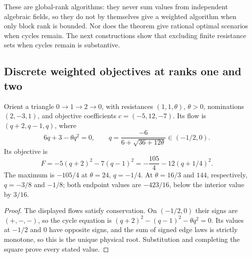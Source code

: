 These are global-rank algorithms: they never sum values from independent
algebraic fields, so they do not by themselves give a weighted algorithm
when only block rank is bounded. Nor does the theorem give rational
optimal scenarios when cycles remain. The next constructions show that
excluding finite resistance sets when cycles remain is substantive.

\subsection{Discrete weighted objectives at ranks one and two}

\begin{lemma}
\label{lem:a-weight-triangle}
Orient a triangle $0\to1\to2\to0$, with resistances $(1,1,\theta)$,
$\theta>0$, nominations $(2,-3,1)$, and objective coefficients
$c=(-5,12,-7)$. Its flow is $(q+2,q-1,q)$, where
\[
 6q+3-\theta q^2=0,\qquad
 q=\frac{-6}{6+\sqrt{36+12\theta}}\in(-1/2,0).
\]
Its objective is
\begin{equation}
 F=-5(q+2)^2-7(q-1)^2
   =-\frac{105}{4}-12(q+1/4)^2.
 \label{eq:a-weight-triangle}
\end{equation}
The maximum is $-105/4$ at $\theta=24$, $q=-1/4$.
At $\theta=16/3$ and $144$, respectively, $q=-3/8$ and $-1/8$;
both endpoint values are $-423/16$, below the interior value by $3/16$.
\end{lemma}
\begin{proof}
The displayed flows satisfy conservation. On $(-1/2,0)$ their signs are
$(+,-,-)$, so the cycle equation is
$(q+2)^2-(q-1)^2-\theta q^2=0$.
Its values at $-1/2$ and $0$ have opposite signs, and the sum of signed
edge laws is strictly monotone, so this is the unique physical root.
Substitution and completing the square prove every stated value.
\end{proof}

